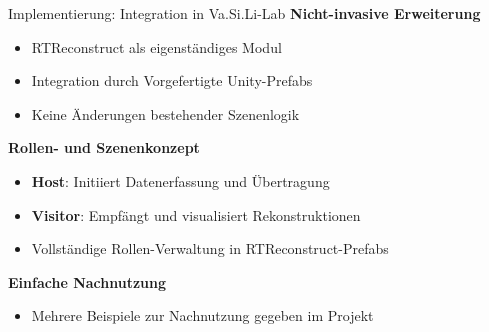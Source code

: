 \begin{frame}{Implementierung: Integration in Va.Si.Li-Lab}{}
    \textbf{Nicht-invasive Erweiterung}
    \begin{itemize}
        \itemsep0.4em
        \item RTReconstruct als eigenständiges Modul
        \item Integration durch Vorgefertigte Unity-Prefabs
        \item Keine Änderungen bestehender Szenenlogik
    \end{itemize}
    
    \vfill
    
    \textbf{Rollen- und Szenenkonzept}
    \begin{itemize}
        \itemsep0.4em
        \item \textbf{Host}: Initiiert Datenerfassung und Übertragung
        \item \textbf{Visitor}: Empfängt und visualisiert Rekonstruktionen
        \item Vollständige Rollen-Verwaltung in RTReconstruct-Prefabs
    \end{itemize}

    \vfill

    \textbf{Einfache Nachnutzung}
    \begin{itemize}
        \item Mehrere Beispiele zur Nachnutzung gegeben im Projekt
    \end{itemize}
\end{frame}